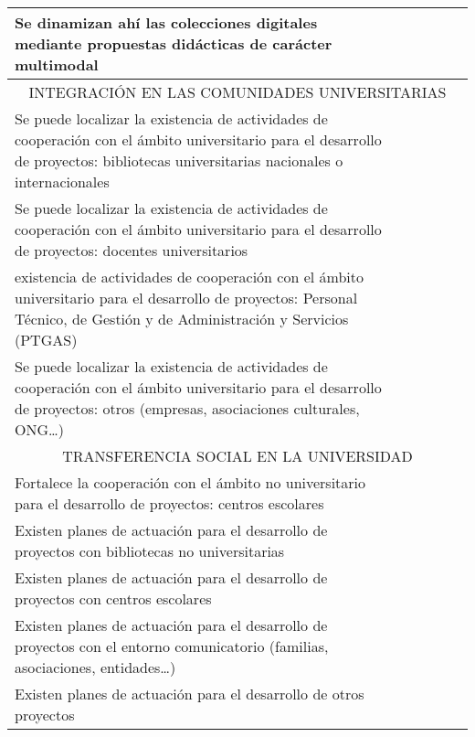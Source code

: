 \documentclass[spanish]{textolivre}
\begin{document}
\begin{small}
\begin{longtable}{p{8cm} |l|l|l|l|l}
\midrule
Se dinamizan ahí las colecciones digitales mediante propuestas didácticas de carácter multimodal & & & & & \\
\midrule
\multicolumn{6}{c}{INTEGRACIÓN EN LAS COMUNIDADES UNIVERSITARIAS} \\
\midrule
Se puede localizar la existencia de actividades de cooperación con el ámbito universitario para el desarrollo de proyectos: bibliotecas universitarias nacionales o internacionales & & & & & \\
\midrule
Se puede localizar la existencia de actividades de cooperación con el ámbito universitario para el desarrollo de proyectos: docentes universitarios & & & & & \\
\midrule
existencia de actividades de cooperación con el ámbito universitario para el desarrollo de proyectos: Personal Técnico, de Gestión y de Administración y Servicios (PTGAS) & & & & & \\
\midrule
Se puede localizar la existencia de actividades de cooperación con el ámbito universitario para el desarrollo de proyectos: otros (empresas, asociaciones culturales, ONG…) & & & & & \\
\midrule
\multicolumn{6}{c}{TRANSFERENCIA SOCIAL EN LA UNIVERSIDAD} \\
\midrule
Fortalece la cooperación con el ámbito no universitario para el desarrollo de proyectos: centros escolares & & & & & \\
\midrule
Existen planes de actuación para el desarrollo de proyectos con bibliotecas no universitarias & & & & & \\
\midrule
Existen planes de actuación para el desarrollo de proyectos con centros escolares & & & & & \\
\midrule
Existen planes de actuación para el desarrollo de proyectos con el entorno comunicatorio (familias, asociaciones, entidades…) & & & & & \\
\midrule
Existen planes de actuación para el desarrollo de otros proyectos & & & & & \\
\bottomrule
\end{longtable}
\end{small}
\end{document}

